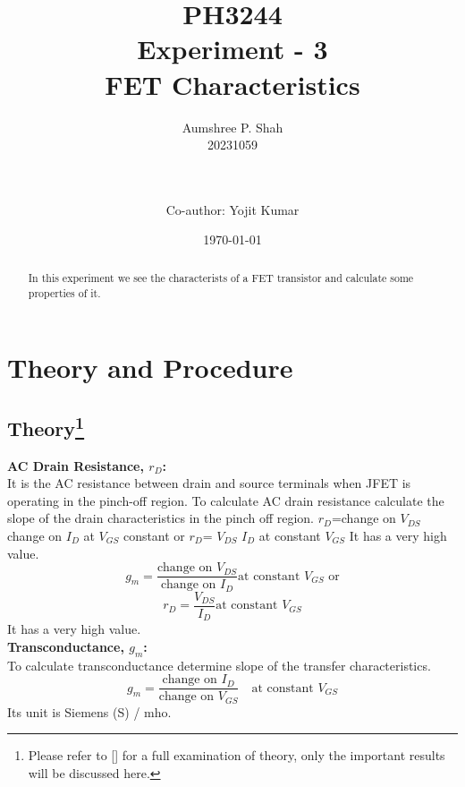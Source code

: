 \documentclass[%
sor,
 jor,
 amsmath,amssymb,
 reprint,
]{revtex4-2}
\begin{document}
\title{PH3244\\Experiment - 3\\ FET Characteristics}
\author{Aumshree P. Shah\\20231059}
\author{\\\\Co-author: Yojit Kumar}
\date{\today}
\begin{abstract}
\centering
In this experiment we see the characterists of a FET transistor and calculate some properties of it.
\end{abstract}
\maketitle
\tableofcontents
\vspace*{\fill}
\pagebreak
\pagebreak
\section{Theory and Procedure}
	\subsection{Theory\footnote{Please refer to [\cite{ph3244repo}] for a full examination of theory, only the important results will be discussed here.}}

\textbf{AC Drain Resistance, $r_D$:}\\ It is the AC resistance between drain and source terminals when JFET is  operating in the pinch-off region. To calculate AC drain resistance calculate  the slope of the drain characteristics in the pinch off region.  $r_D$=change on $V_{DS}$ change on $I_{D}$ at $V_{GS}$ constant or  $r_D$= $V_{DS}$ $I_{D}$ at constant $V_{GS}$ It has a very high value. 
	$$g_m = \frac{\text{change on } V_{DS}}{\text{change on } I_{D}} \text{at constant } V_{GS}\text{ or}$$ 
\begin{equation}
	r_D = \frac{V_{DS}}{I_D} \text{at constant } V_{GS}\label{eq:1} 
\end{equation}
It has a very high value. \\

\textbf{Transconductance, $g_m$:}\\
To calculate transconductance determine slope of the transfer characteristics.
\begin{equation}
g_m = \frac{\text{change on } I_D}{\text{change on } V_{GS}} \quad \text{at constant } V_{GS} 
\end{equation}
Its unit is Siemens (S) / mho.
\end{document}
